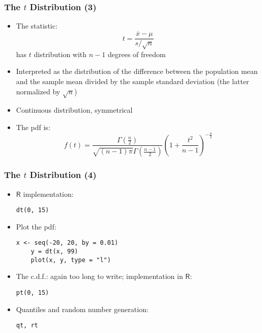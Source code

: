 \documentclass[10pt]{beamer}
\theoremstyle{definition}
\begin{document}
\begin{frame}[fragile]
\frametitle{The $t$ Distribution (3)}
\begin{itemize}
	\item The statistic:
	\[
		t = \frac{\overline{x} - \mu}{s/\sqrt{n}}
	\]
	has $t$ distribution with $n-1$ degrees of freedom

	\item Interpreted as the distribution of the difference between the population mean and the sample mean divided by the sample standard deviation (the latter normalized by $\sqrt{n}$)

	\item Continuous distribution, symmetrical

	\item The pdf is:
	\[
		f(t) = \frac{\Gamma\left(\frac{n}{2}\right)}{\sqrt{(n-1)\pi}\Gamma\left(\frac{n-1}{2}\right)}\left(1 + \frac{t^{2}}{n-1}\right)^{-\frac{n}{2}}
	\]
\end{itemize}
\end{frame}

\begin{frame}[fragile]
\frametitle{The $t$ Distribution (4)}
\begin{itemize}
	\item $\mathsf{R}$ implementation:
	\begin{lstlisting}[style = rstyle, breaklines]
	dt(0, 15)
	\end{lstlisting}
	
	\item Plot the pdf:
	\begin{lstlisting}[style = rstyle, breaklines]
	x <- seq(-20, 20, by = 0.01)
	y = dt(x, 99)
	plot(x, y, type = "l")
	\end{lstlisting}

	\item The c.d.f.: again too long to write; implementation in $\mathsf{R}$:
	\begin{lstlisting}[style = rstyle, breaklines]
	pt(0, 15)
	\end{lstlisting}
	
	\item Quantiles and random number generation:
	\begin{lstlisting}[style = rstyle, breaklines]
	qt, rt
	\end{lstlisting}
\end{itemize}
\end{frame} 
\end{document}
